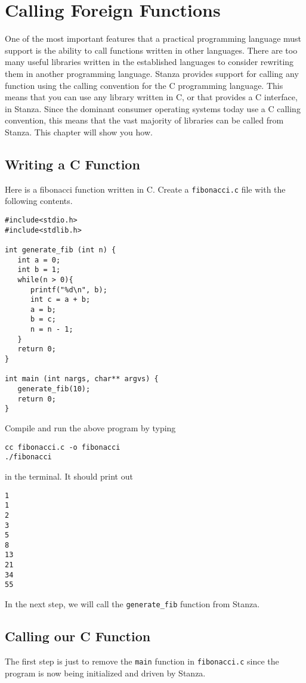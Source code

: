 \documentclass[10pt,oneside]{book}
\begin{document}
\chapter{Calling Foreign Functions}

One of the most important features that a practical programming language must support is the ability to call functions written in other languages. There are too many useful libraries written in the established languages to consider rewriting them in another programming language. Stanza provides support for calling any function using the calling convention for the C programming language. This means that you can use any library written in C, or that provides a C interface, in Stanza. Since the dominant consumer operating systems today use a C calling convention, this means that the vast majority of libraries can be called from Stanza. This chapter will show you how.

\section{Writing a C Function}

Here is a fibonacci function written in C. Create a \texttt{\frenchspacing fibonacci.c} file with the following contents.
\begin{lstlisting}
#include<stdio.h>
#include<stdlib.h>

int generate_fib (int n) {
   int a = 0;
   int b = 1;
   while(n > 0){
      printf("%d\n", b);
      int c = a + b;
      a = b;
      b = c;
      n = n - 1;
   }
   return 0;
}

int main (int nargs, char** argvs) {
   generate_fib(10);
   return 0;
}
\end{lstlisting} 

Compile and run the above program by typing
\begin{lstlisting}
cc fibonacci.c -o fibonacci
./fibonacci
\end{lstlisting}
in the terminal. It should print out
\begin{lstlisting}
1
1
2
3
5
8
13
21
34
55
\end{lstlisting}

In the next step, we will call the \texttt{\frenchspacing generate\_fib} function from Stanza.

\section{Calling our C Function}
The first step is just to remove the \texttt{\frenchspacing main} function in \texttt{\frenchspacing fibonacci.c} since the program is now being initialized and driven by Stanza.
\end{document}
